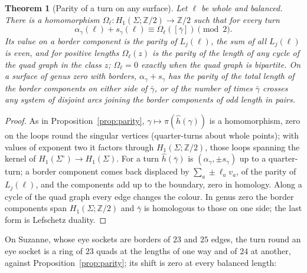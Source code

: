 \documentclass[11pt,a4paper]{article}
\newtheorem{theorem}{Theorem}
\newcommand{\Z}{\mathbb{Z}}
\newcommand{\shift}{s}
\newcommand{\lean}[1]{\texttt{\detokenize{#1}}}
\newenvironment{evidence}[3][]{}{}
\begin{document}
\begin{evidence}{core}{\lean{parity_any_surface}, \lean{colour_comp_trans}, \lean{colour_rotAbout_trans}, \lean{colour_border}, \lean{colour_turn}; tested: 2{,}027 strips of bipartite quad graphs and 1{,}960 annuli of 50 random instances; assumed: that $\pi \circ \hat h$ factors through $H_1(\Sigma; \Z/2)$, and that its value on a class is the parity of the length of a cycle of the quad graph in it}
\begin{theorem}[Parity of a turn on any surface]\label{thm:parity-any}
Let $\ell$ be whole and balanced. There is a homomorphism $\Omega_\ell\colon
H_1(\Sigma; \Z/2) \to \Z/2$ such that for every turn
\[
  \alpha_\gamma(\ell) + \shift_\gamma(\ell) \equiv \Omega_\ell([\bar\gamma]) \pmod 2 .
\]
Its value on a border component is the parity of $L_j(\ell)$, the sum of all
$L_j(\ell)$ is even, and for positive lengths $\Omega_\ell(z)$ is the parity of
the length of any cycle of the quad graph in the class $z$; $\Omega_\ell = 0$
exactly when the quad graph is bipartite. On a surface of genus zero with
borders, $\alpha_\gamma + \shift_\gamma$ has the parity of the total length of
the border components on either side of $\bar\gamma$, or of the number of times
$\bar\gamma$ crosses any system of disjoint arcs joining the border components
of odd length in pairs.
\end{theorem}
\end{evidence}
\begin{proof}
As in Proposition~\ref{prop:parity}, $\gamma \mapsto \pi(\hat h(\gamma))$ is a
homomorphism, zero on the loops round the singular vertices (quarter-turns
about whole points); with values of exponent two it factors through
$H_1(\Sigma; \Z/2)$, those loops spanning the kernel of $H_1(\Sigma^\circ)
\to H_1(\Sigma)$. For a turn $\hat h(\bar\gamma)$ is $(\alpha_\gamma,
\pm\shift_\gamma)$ up to a quarter-turn; a border component comes back
displaced by $\sum_a \pm\ell_a v_a$, of the parity of $L_j(\ell)$, and the
components add up to the boundary, zero in homology. Along a cycle of the quad
graph every edge changes the colour. In genus zero the border components span
$H_1(\Sigma; \Z/2)$ and $\bar\gamma$ is homologous to those on one side; the
last form is Lefschetz duality.
\end{proof}

On Suzanne, whose eye sockets are borders of $23$ and $25$ edges, the turn
round an eye socket is a ring of $23$ quads at the lengths of one way and of
$24$ at another, against Proposition~\ref{prop:parity}; its shift is zero at
every balanced length:
\end{document}
